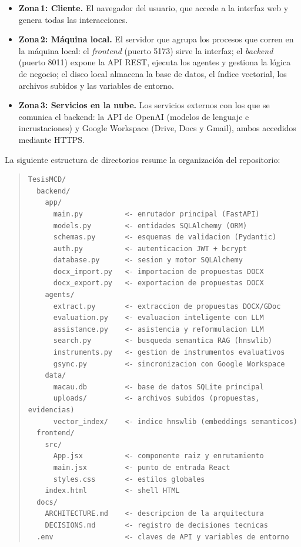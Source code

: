 \begin{itemize}
  \item \textbf{Zona\,1: Cliente.} El navegador del usuario, que accede a la
    interfaz web y genera todas las interacciones.
  \item \textbf{Zona\,2: Máquina local.} El servidor que agrupa los procesos que corren en la máquina
local: el \textit{frontend} (puerto 5173) sirve la interfaz;
el \textit{backend} (puerto 8011) expone la API REST, ejecuta los
agentes y gestiona la lógica de negocio; el disco local almacena la
base de datos, el índice vectorial, los archivos subidos y las
variables de entorno. 
  \item \textbf{Zona\,3: Servicios en la nube.} Los servicios externos con los que se comunica el backend: la API de OpenAI (modelos de lenguaje e incrustaciones) y Google Workspace (Drive, Docs y Gmail), ambos accedidos mediante HTTPS.
\end{itemize}


La siguiente estructura de directorios resume la organización del
repositorio:

\begin{quote}
\begin{lstlisting}[basicstyle=\fontsize{9pt}{11pt}\selectfont\ttfamily, frame=none,
    aboveskip=0pt, belowskip=0pt]
TesisMCD/
  backend/
    app/
      main.py          <- enrutador principal (FastAPI)
      models.py        <- entidades SQLAlchemy (ORM)
      schemas.py       <- esquemas de validacion (Pydantic)
      auth.py          <- autenticacion JWT + bcrypt
      database.py      <- sesion y motor SQLAlchemy
      docx_import.py   <- importacion de propuestas DOCX
      docx_export.py   <- exportacion de propuestas DOCX
    agents/
      extract.py       <- extraccion de propuestas DOCX/GDoc
      evaluation.py    <- evaluacion inteligente con LLM
      assistance.py    <- asistencia y reformulacion LLM
      search.py        <- busqueda semantica RAG (hnswlib)
      instruments.py   <- gestion de instrumentos evaluativos
      gsync.py         <- sincronizacion con Google Workspace
    data/
      macau.db         <- base de datos SQLite principal
      uploads/         <- archivos subidos (propuestas, evidencias)
      vector_index/    <- indice hnswlib (embeddings semanticos)
  frontend/
    src/
      App.jsx          <- componente raiz y enrutamiento
      main.jsx         <- punto de entrada React
      styles.css       <- estilos globales
    index.html         <- shell HTML
  docs/
    ARCHITECTURE.md    <- descripcion de la arquitectura
    DECISIONS.md       <- registro de decisiones tecnicas
  .env                 <- claves de API y variables de entorno
\end{lstlisting}
\end{quote}


